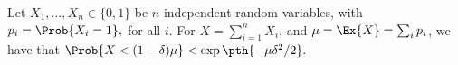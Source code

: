 \begin{lemma}
    Let $X_1, \ldots, X_n \in \{0,1\}$ be $n$ independent random
    variables, with
    \begin{math}
        p_i = \Prob{ \bigl. X_i = 1 },
    \end{math}
    for all $i$.  For $X = \sum_{i=1}^{n} X_i$, and
    $\mu = \Ex{\bigl. X} = \sum_i p_i$, we have that
    \begin{math}
        \Prob{\bigl. X < (1-\delta)\mu } < \exp\pth{-\mu\delta^2/2}.
    \end{math}
\end{lemma}
